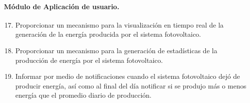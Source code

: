 \paragraph{Módulo de Aplicación de usuario.}
\begin{enumerate}[label=RF\arabic*.]
	\setcounter{enumi}{16}
	\item Proporcionar un mecanismo para la visualización en tiempo real de la generación  de la energía producida por el sistema fotovoltaico.
	\item Proporcionar un mecanismo para la generación de estadísticas de la producción de energía por el sistema fotovoltaico.
	\item Informar por medio de notificaciones cuando el sistema fotovoltaico dejó de producir energía, así como al final del día notificar si se produjo más o menos energía que el promedio diario de producción.  
\end{enumerate}
